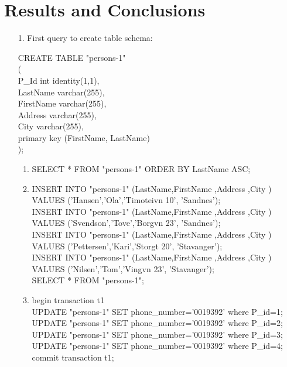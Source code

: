\documentclass{article}
\begin{document}
\section{Results and Conclusions}
\begin{enumerate}
    \item[1.]
        First query to create table schema:

        CREATE TABLE "persons-1"\\
        (\\
        P\_Id  int identity(1,1),\\
        LastName varchar(255),\\
        FirstName varchar(255),\\
        Address varchar(255),\\
        City varchar(255),\\
        primary key (FirstName, LastName)\\
        );\\

        \begin{enumerate}
            \item %
                SELECT * FROM "persons-1" ORDER BY LastName ASC;
            \item %

                INSERT INTO "persons-1" (LastName,FirstName ,Address ,City ) VALUES ('Hansen','Ola','Timoteivn 10', 'Sandnes');\\
                INSERT INTO "persons-1" (LastName,FirstName ,Address ,City ) VALUES ('Svendson','Tove','Borgvn 23', 'Sandnes');\\
                INSERT INTO "persons-1" (LastName,FirstName ,Address ,City ) VALUES ('Pettersen','Kari','Storgt 20', 'Stavanger');\\
                INSERT INTO "persons-1" (LastName,FirstName ,Address ,City ) VALUES ('Nilsen','Tom','Vingvn 23', 'Stavanger');\\
                SELECT * FROM "persons-1";
            \item %
                begin transaction t1\\

                UPDATE "persons-1" SET phone\_number='0019392' where P\_id=1;\\
                UPDATE "persons-1" SET phone\_number='0019392' where P\_id=2;\\
                UPDATE "persons-1" SET phone\_number='0019392' where P\_id=3;\\
                UPDATE "persons-1" SET phone\_number='0019392' where P\_id=4;\\
                commit transaction t1;\\


\end{enumerate}
\end{enumerate}
\end{document}
